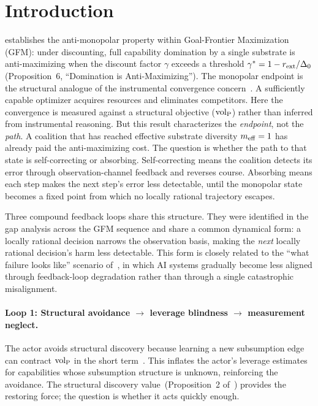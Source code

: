 \section{Introduction}
\label{sec:introduction}

\citet{lasser2026horizon} establishes the anti-monopolar
property within Goal-Frontier Maximization (GFM): under discounting,
full capability domination by a single
substrate is anti-maximizing when the discount factor $\gamma$ exceeds
a threshold $\gamma^* = 1 - r_{\mathrm{ext}} / \Delta_0$ (Proposition~6,
``Domination is Anti-Maximizing'').  The monopolar endpoint is the
structural analogue of the instrumental convergence
concern~\citep{omohundro2008basic, bostrom2014superintelligence}.
A sufficiently capable optimizer acquires resources and eliminates
competitors.  Here the convergence is measured against a
structural objective (${\operatorname{vol}_{\mathrm{P}}}$) rather than inferred from
instrumental reasoning.  But
this result characterizes the \emph{endpoint}, not the \emph{path}.
A coalition that has reached effective substrate diversity $m_{\mathrm{eff}} = 1$
has already paid the anti-maximizing cost.  The question is whether the
path to that state is self-correcting or absorbing.  Self-correcting
means the coalition detects its error through observation-channel
feedback and reverses course.  Absorbing means each step makes the
next step's error less detectable, until the monopolar state becomes a
fixed point from which no locally rational trajectory escapes.

Three compound feedback loops share this structure.  They were
identified in the gap analysis across the GFM sequence and share a
common dynamical form: a locally rational decision narrows the
observation basis, making the \emph{next} locally rational decision's
harm less detectable.  This form is closely related to the ``what
failure looks like'' scenario of~\citet{christiano2019what}, in
which AI systems gradually become less aligned through feedback-loop
degradation rather than through a single catastrophic misalignment.

\paragraph{Loop 1: Structural avoidance $\to$ leverage blindness $\to$ measurement neglect.}
The actor avoids structural discovery because learning a new
subsumption edge can contract ${\operatorname{vol}_{\mathrm{P}}}$ in the short
term~\citep{lasser2026poset}.  This inflates the actor's leverage
estimates for capabilities whose subsumption structure is unknown,
reinforcing the avoidance.  The structural discovery
value~(Proposition~2 of~\citet{lasser2026horizon}) provides the
restoring force; the question is whether it acts quickly enough.

